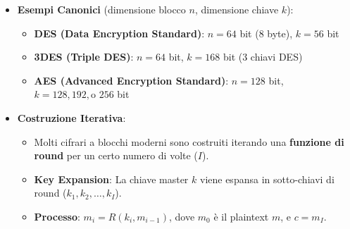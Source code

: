 \documentclass{article}
\begin{document}
\begin{itemize}
    \item \textbf{Esempi Canonici} (dimensione blocco $n$, dimensione chiave $k$):
    \begin{itemize}
        \item \textbf{DES (Data Encryption Standard)}: $n = 64$ bit (8 byte), $k = 56$ bit
        \item \textbf{3DES (Triple DES)}: $n = 64$ bit, $k = 168$ bit (3 chiavi DES)
        \item \textbf{AES (Advanced Encryption Standard)}: $n = 128$ bit, $k = 128, 192, \text{o } 256$ bit
    \end{itemize}
    \item \textbf{Costruzione Iterativa}:
    \begin{itemize}
        \item Molti cifrari a blocchi moderni sono costruiti iterando una \textbf{funzione di round} per un certo numero di volte ($I$).
        \item \textbf{Key Expansion}: La chiave master $k$ viene espansa in sotto-chiavi di round ($k_1, k_2, \dots, k_I$).
        \item \textbf{Processo}: $m_i = R(k_i, m_{i-1})$, dove $m_0$ è il plaintext $m$, e $c = m_I$.
    \end{itemize}
\end{itemize}
\end{document}
